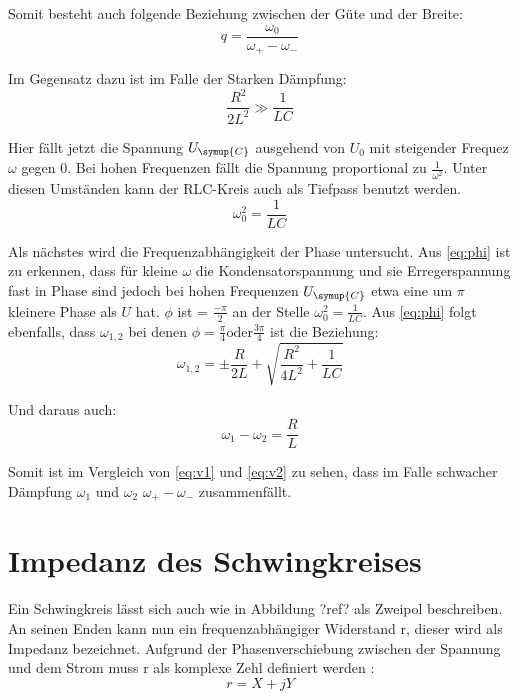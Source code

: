     Somit besteht auch folgende Beziehung zwischen der Güte und der Breite:
    \begin{equation}
        q = \frac{\omega_0}{\omega_+ - \omega_-} \nonumber
    \end{equation}

    Im Gegensatz dazu ist im Falle der Starken Dämpfung:
    \begin{equation}
        \frac{R^2}{2L^2} \gg \frac{1}{LC} \nonumber
    \end{equation}

    Hier fällt jetzt die Spannung $U_{\symup{C}}$ ausgehend von $U_0$ mit steigender Frequez $\omega$ gegen 0. Bei hohen Frequenzen fällt
    die Spannung proportional zu $\frac{1}{\omega^2}$. Unter diesen Umständen kann der RLC-Kreis auch als Tiefpass benutzt werden.
    \begin{equation}
        \omega^2_0 = \frac{1}{LC} \nonumber
    \end{equation}

    Als nächstes wird die Frequenzabhängigkeit der Phase untersucht. Aus \ref{eq:phi} ist zu erkennen, dass für kleine $\omega$ die 
    Kondensatorspannung und sie Erregerspannung fast in Phase sind jedoch bei hohen Frequenzen $U_{\symup{C}}$ etwa eine um $\pi$ 
    kleinere Phase als $U$ hat. $\phi$ ist = $\frac{-\pi}{2}$ an der Stelle $\omega^2_0 = \frac{1}{LC}$.
    Aus \ref{eq:phi} folgt ebenfalls, dass $\omega_{1,2}$ bei denen $\phi= \frac{\pi}{4} \text{oder} \frac{3\pi}{4}$ ist die Beziehung:
    \begin{equation}
        \omega_{1,2} = \pm  \frac{R}{2L} + \sqrt{\frac{R^2}{4L^2}+ \frac{1}{LC}} \nonumber
    \end{equation}

    Und daraus auch:
    \begin{equation}
        \omega_1 - \omega_2 = \frac{R}{L} 
        \label{eq:v2}
    \end{equation}

    Somit ist im Vergleich von \ref{eq:v1} und \ref{eq:v2} zu sehen, dass im Falle schwacher Dämpfung $\omega_1$ und $\omega_2$ 
    $\omega_+ - \omega_-$ zusammenfällt.

    \section{Impedanz des Schwingkreises}

    Ein Schwingkreis lässt sich auch wie in Abbildung ?ref? als Zweipol beschreiben. An seinen Enden kann nun ein frequenzabhängiger 
    Widerstand r, dieser wird als Impedanz bezeichnet. Aufgrund der Phasenverschiebung zwischen der Spannung und dem Strom muss r als 
    komplexe Zehl definiert werden :
    \begin{equation}
        r = X + jY \nonumber
    \end{equation}

